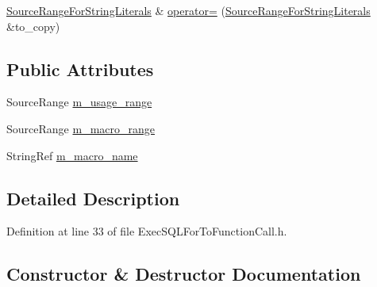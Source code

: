 \begin{DoxyCompactItemize}
\item 
\hyperlink{classclang_1_1tidy_1_1pagesjaunes_1_1_exec_s_q_l_for_to_function_call_1_1_source_range_for_string_literals}{Source\+Range\+For\+String\+Literals} \& \hyperlink{classclang_1_1tidy_1_1pagesjaunes_1_1_exec_s_q_l_for_to_function_call_1_1_source_range_for_string_literals_ab5ae08d2dad5e22f5666ac30aa1bf233}{operator=} (\hyperlink{classclang_1_1tidy_1_1pagesjaunes_1_1_exec_s_q_l_for_to_function_call_1_1_source_range_for_string_literals}{Source\+Range\+For\+String\+Literals} \&to\+\_\+copy)
\end{DoxyCompactItemize}
\subsection*{Public Attributes}
\begin{DoxyCompactItemize}
\item 
Source\+Range \hyperlink{classclang_1_1tidy_1_1pagesjaunes_1_1_exec_s_q_l_for_to_function_call_1_1_source_range_for_string_literals_a5db74b17e5bfe851c4589257b7dee62e}{m\+\_\+usage\+\_\+range}
\item 
Source\+Range \hyperlink{classclang_1_1tidy_1_1pagesjaunes_1_1_exec_s_q_l_for_to_function_call_1_1_source_range_for_string_literals_a1a45e1e70024f9902ad33255070aadd2}{m\+\_\+macro\+\_\+range}
\item 
String\+Ref \hyperlink{classclang_1_1tidy_1_1pagesjaunes_1_1_exec_s_q_l_for_to_function_call_1_1_source_range_for_string_literals_aa4708363603d42190b3fd3dc96761f10}{m\+\_\+macro\+\_\+name}
\end{DoxyCompactItemize}


\subsection{Detailed Description}


Definition at line 33 of file Exec\+S\+Q\+L\+For\+To\+Function\+Call.\+h.



\subsection{Constructor \& Destructor Documentation}
\mbox{\label{classclang_1_1tidy_1_1pagesjaunes_1_1_exec_s_q_l_for_to_function_call_1_1_source_range_for_string_literals_a6c8f2efc8ad72308e73d6c2557fb5c6e}} 
